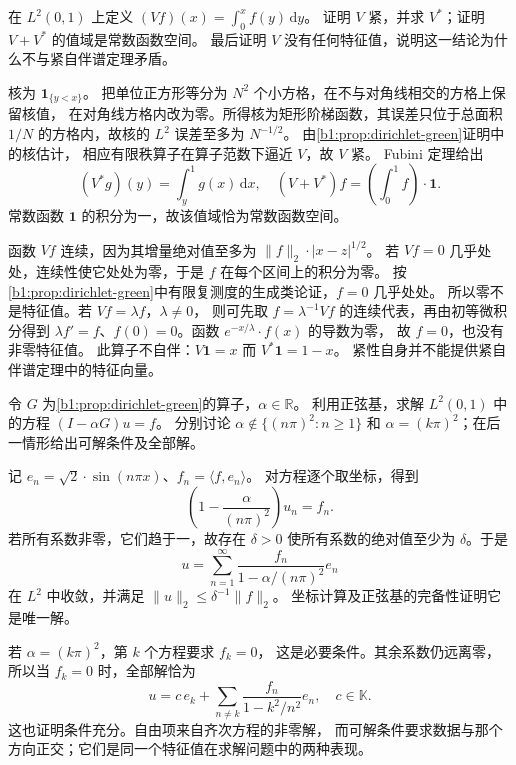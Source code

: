 \begin{optionalexercise}\label{b1:ex:08-volterra}
在 \(L^2(0,1)\) 上定义%
\((Vf)(x)=\int_0^x f(y)\,\mathrm{d}y\)。
证明 \(V\) 紧，并求 \(V^*\)；证明 \(V+V^*\) 的值域是常数函数空间。
最后证明 \(V\) 没有任何特征值，说明这一结论为什么不与紧自伴谱定理矛盾。
\end{optionalexercise}
\begin{solution}
核为 \(\mathbf1_{\{y<x\}}\)。
把单位正方形等分为 \(N^2\) 个小方格，在不与对角线相交的方格上保留核值，
在对角线方格内改为零。所得核为矩形阶梯函数，其误差只位于总面积 \(1/N\)
的方格内，故核的 \(L^2\) 误差至多为 \(N^{-1/2}\)。
由\cref{b1:prop:dirichlet-green}证明中的核估计，
相应有限秩算子在算子范数下逼近 \(V\)，故 \(V\) 紧。
Fubini 定理给出
\[
 (V^*g)(y)=\int_y^1g(x)\,\mathrm{d}x,\quad
 (V+V^*)f=\left(\int_0^1f\right)\cdot \mathbf1.
\]
常数函数 \(\mathbf1\) 的积分为一，故该值域恰为常数函数空间。

函数 \(Vf\) 连续，因为其增量绝对值至多为%
\(\|f\|_2\cdot|x-z|^{1/2}\)。
若 \(Vf=0\) 几乎处处，连续性使它处处为零，于是 \(f\) 在每个区间上的积分为零。
按\cref{b1:prop:dirichlet-green}中有限复测度的生成类论证，\(f=0\) 几乎处处。
所以零不是特征值。若 \(Vf=\lambda f\)，\(\lambda\ne0\)，
则可先取 \(f=\lambda^{-1}Vf\) 的连续代表，再由初等微积分得到%
\(\lambda f'=f\)、\(f(0)=0\)。函数 \(e^{-x/\lambda}\cdot f(x)\) 的导数为零，
故 \(f=0\)，也没有非零特征值。
此算子不自伴：\(V\mathbf1=x\) 而 \(V^*\mathbf1=1-x\)。
紧性自身并不能提供紧自伴谱定理中的特征向量。
\end{solution}

\begin{optionalexercise}\label{b1:ex:08-green-resonance}
令 \(G\) 为\cref{b1:prop:dirichlet-green}的算子，\(\alpha\in\mathbb R\)。
利用正弦基，求解 \(L^2(0,1)\) 中的方程%
\((I-\alpha G)u=f\)。
分别讨论 \(\alpha\notin\{(n\pi)^2:n\geq1\}\) 和%
\(\alpha=(k\pi)^2\)；在后一情形给出可解条件及全部解。
\end{optionalexercise}
\begin{solution}
记 \(e_n=\sqrt2\cdot \sin(n\pi x)\)、\(f_n=\langle f,e_n\rangle\)。
对方程逐个取坐标，得到
\[
 \left(1-\frac{\alpha}{(n\pi)^2}\right)u_n=f_n.
\]
若所有系数非零，它们趋于一，故存在 \(\delta>0\) 使所有系数的绝对值至少为%
\(\delta\)。于是
\[
 u=\sum_{n=1}^\infty\frac{f_n}{1-\alpha/(n\pi)^2}e_n
\]
在 \(L^2\) 中收敛，并满足 \(\|u\|_2\leq\delta^{-1}\|f\|_2\)。
坐标计算及正弦基的完备性证明它是唯一解。

若 \(\alpha=(k\pi)^2\)，第 \(k\) 个方程要求 \(f_k=0\)，
这是必要条件。其余系数仍远离零，所以当 \(f_k=0\) 时，全部解恰为
\[
 u=c\,e_k+\sum_{n\ne k}
       \frac{f_n}{1-k^2/n^2}e_n,\quad c\in\mathbb K.
\]
这也证明条件充分。自由项来自齐次方程的非零解，
而可解条件要求数据与那个方向正交；它们是同一个特征值在求解问题中的两种表现。
\end{solution}
